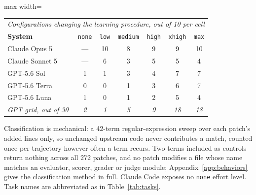 \begin{table}[t]
\par\vspace{6pt}
\begin{adjustbox}{max width=\linewidth}
\begin{tabular}{lcccccc}
\toprule
\multicolumn{7}{l}{\emph{Configurations changing the learning procedure, out of 10 per cell}} \\
\textbf{System} & \texttt{none} & \texttt{low} & \texttt{medium} & \texttt{high} & \texttt{xhigh} & \texttt{max} \\
\midrule
Claude Opus 5   & --- & 10 &  8 & 9 & 9 & 10 \\
Claude Sonnet 5 & --- &  6 &  3 & 5 & 5 &  4 \\
GPT-5.6 Sol     &  1  &  1 &  3 & 4 & 7 &  7 \\
GPT-5.6 Terra   &  0  &  0 &  1 & 3 & 6 &  7 \\
GPT-5.6 Luna    &  1  &  0 &  1 & 2 & 5 &  4 \\
\midrule
\emph{GPT grid, out of 30} & \emph{2} & \emph{1} & \emph{5} & \emph{9} & \emph{18} & \emph{18} \\
\bottomrule
\end{tabular}
\end{adjustbox}
\par\vspace{2pt}
{\footnotesize Classification is mechanical: a 42-term regular-expression sweep over each patch's
added lines only, so unchanged upstream code never contributes a match, counted once per
trajectory however often a term recurs. Two terms included as controls return nothing across all
$272$ patches, and no patch modifies a file whose name matches an evaluator, scorer, grader or
judge module; Appendix~\ref{app:behaviors} gives the classification method in full. Claude Code exposes no \texttt{none} effort level. Task names are
abbreviated as in Table~\ref{tab:tasks}.}
\end{table}
